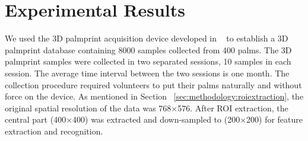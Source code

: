 \chapter{Experimental Results\label{ch:experiment}}

We used the 3D palmprint acquisition device developed in ~\cite{Zhang:2009dp} to establish a 3D palmprint database containing 8000 samples collected from 400 palms. The 3D palmprint samples were collected in two separated sessions, 10 samples in each session. The average time interval between the two sessions is one month. The collection procedure required volunteers to put their palms naturally and without force on the device. As mentioned in Section ~\ref{sec:methodology:roiextraction}, the original spatial resolution of the data was 768×576. After ROI extraction, the central part (400×400) was extracted and down-sampled to (200×200) for feature extraction and recognition.



